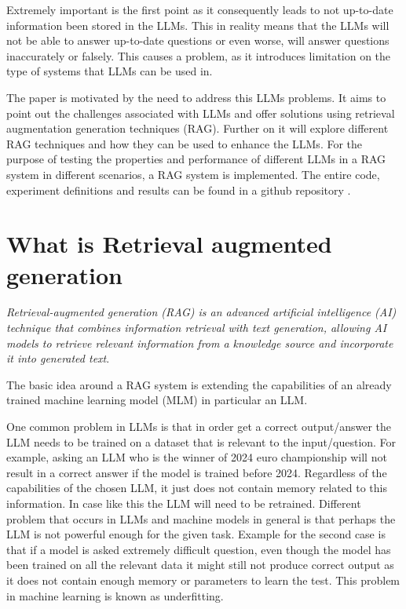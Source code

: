 \documentclass{wseas}
\begin{document}
Extremely important is the first point as it consequently leads to
not up-to-date information been stored in the LLMs. This in reality means that
the LLMs will not be able to answer up-to-date questions or even worse, will
answer questions inaccurately or falsely. This causes a problem, as it 
introduces limitation on the type of systems that LLMs can be used in.

The paper is motivated by the need to address this LLMs problems.
It aims to point out the challenges associated with LLMs and offer solutions
using retrieval augmentation generation techniques (RAG). 
Further on it will explore different RAG techniques and how they can be used  
to enhance the LLMs. For the purpose of testing the properties and performance 
of different LLMs in a RAG system in different scenarios, a RAG system is implemented. 
The entire code, experiment definitions and results can be found in a github repository
\cite{cite_github_solution}.

\section{What is Retrieval augmented generation}

\emph{Retrieval-augmented generation (RAG) is an advanced
 artificial intelligence (AI) technique that combines information 
 retrieval with text generation, allowing AI models to retrieve 
 relevant information from a knowledge source and incorporate it 
 into generated text}\cite{website_deffinition_rag}.


The basic idea around a RAG system is extending the capabilities of an
already trained machine learning model (MLM) in particular an LLM.

One common problem in LLMs is that in order get a correct output/answer
the LLM needs to be trained on a dataset that is relevant to the
input/question. For example, asking an LLM who is the winner of 2024
euro championship will not result in a correct answer if the model is
trained before 2024. Regardless of the capabilities of the chosen LLM,
it just does not contain memory related to this information. In case
like this the LLM will need to be retrained. Different problem that
occurs in LLMs and machine models in general is that perhaps the LLM is
not powerful enough for the given task. Example for the second case is
that if a model is asked extremely difficult question, even though the
model has been trained on all the relevant data it might still not
produce correct output as it does not contain enough memory or parameters
to learn the test. This problem in machine learning is known as underfitting.
\end{document}
